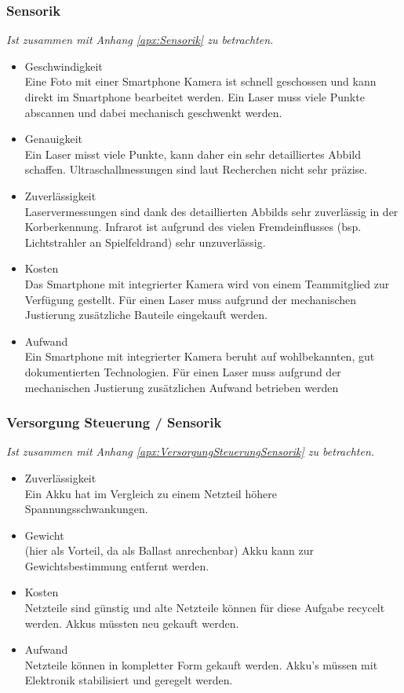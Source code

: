 		\subsubsection{Sensorik}
			\textit{Ist zusammen mit Anhang \ref{apx:Sensorik} zu betrachten.}
			\begin{itemize}
				\item Geschwindigkeit\\
				Eine Foto mit einer Smartphone Kamera ist schnell geschossen und kann direkt im Smartphone bearbeitet werden. Ein Laser muss viele Punkte abscannen und dabei mechanisch geschwenkt werden.
				\item Genauigkeit\\
				Ein Laser misst viele Punkte, kann daher ein sehr detailliertes Abbild schaffen. Ultraschallmessungen sind laut Recherchen nicht sehr präzise.  
				\item Zuverlässigkeit\\
				Laservermessungen sind dank des detaillierten Abbilds sehr zuverlässig in der Korberkennung. Infrarot ist aufgrund des vielen Fremdeinflusses (bsp. Lichtstrahler an Spielfeldrand) sehr unzuverlässig.
				\item Kosten\\
				Das Smartphone mit integrierter Kamera wird von einem Teammitglied zur Verfügung gestellt. Für einen Laser muss aufgrund der mechanischen Justierung zusätzliche Bauteile eingekauft werden.
				\item Aufwand\\
				Ein Smartphone mit integrierter Kamera beruht auf wohlbekannten, gut dokumentierten Technologien. Für einen Laser muss aufgrund der mechanischen Justierung zusätzlichen Aufwand betrieben werden
			\end{itemize}
			
		\subsubsection{Versorgung Steuerung / Sensorik}
			\textit{Ist zusammen mit Anhang \ref{apx:VersorgungSteuerungSensorik} zu betrachten.}
			\begin{itemize}
				\item Zuverlässigkeit\\
				Ein Akku hat im Vergleich zu einem Netzteil höhere Spannungsschwankungen.
				\item Gewicht\\
				(hier als Vorteil, da als Ballast anrechenbar) Akku kann zur Gewichtsbestimmung entfernt werden.
				\item Kosten\\
				Netzteile sind günstig und alte Netzteile können für diese Aufgabe recycelt werden. Akkus müssten neu gekauft werden.
				\item Aufwand\\
				Netzteile können in kompletter Form gekauft werden. Akku’s müssen mit Elektronik stabilisiert und geregelt werden.
			\end{itemize}	
		
